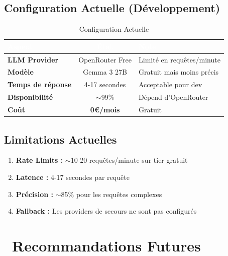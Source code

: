 \documentclass[12pt,a4paper]{article}
\begin{document}
\subsection{Configuration Actuelle (Développement)}

\begin{table}[H]
\centering
{}
\begin{tabular}{|>{\bfseries}l|c|l|}
\hline
\rowcolor{accentorange}
\textcolor{white}{\textbf{Aspect}} & \textcolor{white}{\textbf{État}} & \textcolor{white}{\textbf{Note}} \\
\hline
LLM Provider & OpenRouter Free & Limité en requêtes/minute \\
Modèle & Gemma 3 27B & Gratuit mais moins précis \\
Temps de réponse & 4-17 secondes & Acceptable pour dev \\
Disponibilité & $\sim$99\% & Dépend d'OpenRouter \\
\rowcolor{successbox!30}
Coût & \textbf{0€/mois} & Gratuit \\
\hline
\end{tabular}
\caption{Configuration Actuelle}
\end{table}

\subsection{Limitations Actuelles}

\begin{warningbox}[title={\faExclamationTriangle\ Limitations à Résoudre}]
\begin{enumerate}
    \item \textbf{Rate Limits :} $\sim$10-20 requêtes/minute sur tier gratuit
    \item \textbf{Latence :} 4-17 secondes par requête
    \item \textbf{Précision :} $\sim$85\% pour les requêtes complexes
    \item \textbf{Fallback :} Les providers de secours ne sont pas configurés
\end{enumerate}
\end{warningbox}

\newpage

\section{\faRocket\ Recommandations Futures}
\end{document}
